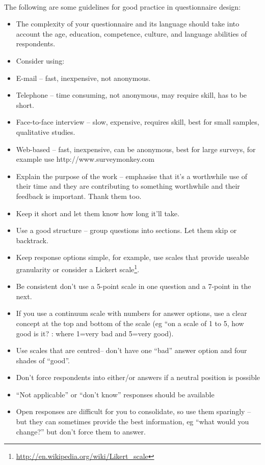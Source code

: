\paragraph{} The following are some guidelines for good practice in questionnaire design:
\begin{itemize}
\item The complexity of your questionnaire and its language should take into account the age, education, competence, culture, and language abilities of respondents.
\item Consider using:
\item E-mail – fast, inexpensive, not anonymous.
\item Telephone – time consuming, not anonymous, may require skill, has to be short.
\item Face-to-face interview – slow, expensive, requires skill, best for small samples, qualitative studies.
\item Web-based – fast, inexpensive, can be anonymous, best for large surveys, for example use http://www.surveymonkey.com
\item Explain the purpose of the work – emphasise that it’s a worthwhile use of their time and they are contributing to something worthwhile and their feedback is important. Thank them too.
\item Keep it short and let them know how long it’ll take.
\item Use a good structure – group questions into sections. Let them skip or backtrack.
\item Keep response options simple, for example, use scales that provide useable granularity or consider a Lickert scale\footnote{\url{http://en.wikipedia.org/wiki/Likert_scale}}.
\item Be consistent don’t use a 5-point scale in one question and a 7-point in the next.
\item If you use a continuum scale with numbers for answer options, use a clear concept at the top and bottom of the scale (eg “on a scale of 1 to 5, how good is it? : where 1=very bad and 5=very good).
\item Use scales that are centred– don’t have one “bad” answer option and four shades of “good”.
\item Don’t force respondents into either/or answers if a neutral position is possible
\item ``Not applicable'' or ``don’t know'' responses should be available
\item Open responses are difficult for you to consolidate, so use them sparingly – but they can sometimes provide the best information, eg “what would you change?” but don’t force them to answer.
\end{itemize}

